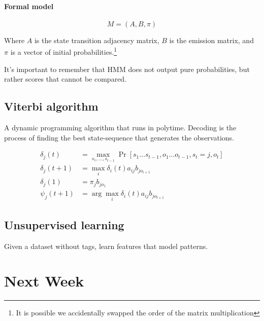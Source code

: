 \documentclass{idc_msc}
\begin{document}
\paragraph{Formal model}

\[
  M = (A, B, \pi)
\]

Where \(A\) is the state transition adjacency matrix, \(B\) is the emission matrix, and \(\pi\) is a vector of initial probabilities.\footnote{It is possible we accidentally swapped the order of the matrix multiplication}

It's important to remember that HMM does not output pure probabilities, but rather scores that cannot be compared.

\subsection{Viterbi algorithm}

A dynamic programming algorithm that runs in polytime.
Decoding is the process of finding the best state-sequence that generates the observations.

\[
\begin{aligned}
  \delta_j(t) &= \max_{s_1, \ldots, s_{t-1}} \Pr[s_1\ldots s_{t-1}, o_1 \ldots o_{t-1}, s_t = j, o_t] \\
  \delta_j(t+1) &= \max_i \delta_i(t) a_{ij}b_{jo_{i+1}} \\
  \delta_j(1) &= \pi_j b_{jo_1} \\
  \psi_j(t+1) &= \arg\max_i \delta_i(t) a_{ij} b_{j o_{t+1}}
\end{aligned}
\]

\subsection{Unsupervised learning}

Given a dataset without tags, learn features that model patterns.

\section{Next Week}
\end{document}
